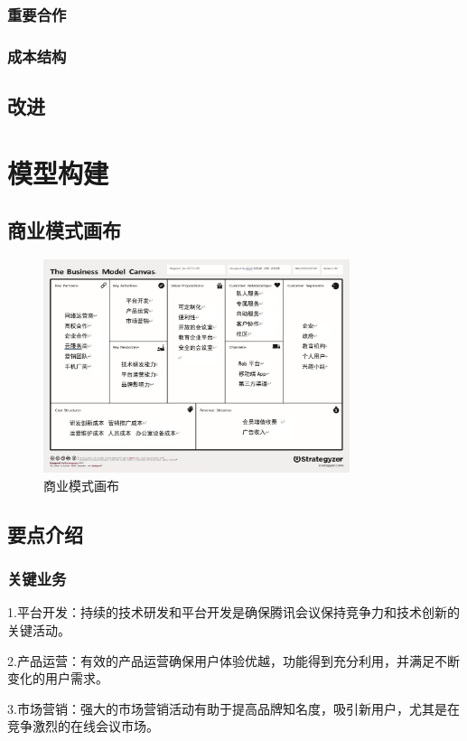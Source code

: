 \documentclass[a4paper,12pt]{article}
\begin{document}
    \subsubsection{重要合作}
    \subsubsection{成本结构}
    \subsection{改进}
    \section{模型构建}
    \subsection{商业模式画布}
    \begin{figure}[H]
        \centering
        \includegraphics[width=0.8\textwidth]{第三次商业模式画布.jpg}
        \caption{商业模式画布}
    \end{figure}
    \clearpage
    \subsection{要点介绍}
    \subsubsection{关键业务}
    1.平台开发：持续的技术研发和平台开发是确保腾讯会议保持竞争力和技术创新的关键活动。

    2.产品运营：有效的产品运营确保用户体验优越，功能得到充分利用，并满足不断变化的用户需求。

    3.市场营销：强大的市场营销活动有助于提高品牌知名度，吸引新用户，尤其是在竞争激烈的在线会议市场。
\end{document}

